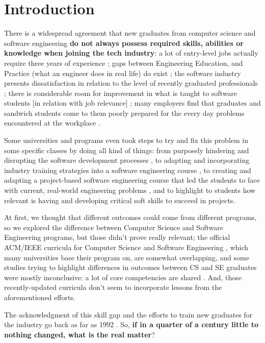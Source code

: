 \documentclass{sigchi}
\begin{document}
\section{Introduction}
There is a widespread agreement that new graduates from computer science and software engineering \textbf{do not always possess required skills, abilities or knowledge when joining the tech industry}: a lot of entry-level jobs actually require three years of experience \cite{Chakrabarti2018}; gaps between Engineering Education, and Practice (what an engineer does in real life) do exist \cite{Sivanesan2017}; the software industry presents dissatisfaction in relation to the level of recently graduated professionals \cite{Portela2017}; there is considerable room for improvement in what is taught to software students [in relation with job relevance] \cite{Lethbridgea}; many employers find that graduates and sandwich students come to them poorly prepared for the every day problems encountered at the workplace \cite{Dawson2000}.

Some universities and programs even took steps to try and fix this problem in some specific classes by doing all kind of things: from purposely hindering and disrupting the software development processes \cite{Dawson2000}, to adapting and incorporating industry training strategies into a software engineering course \cite{Portela2017}, to creating and adapting a project-based software engineering course that led the students to face with current, real-world engineering problems \cite{Delgado2017}, and to highlight to students how relevant is having and developing critical soft skills to succeed in projects\cite{Bastarrica2017}.

At first, we thought that different outcomes could come from different programs, so we explored the difference between Computer Science and Software Engineering programs, but those didn't prove really relevant; the official ACM/IEEE curricula for Computer Science \cite{Force2013} and Software Engineering \cite{Ardis2015}, which many universities base their program on, are somewhat overlapping, and some studies trying to highlight differences in outcomes between CS and SE graduates were mostly inconclusive: a lot of core competencies are shared \cite{Meziane2004} \cite{Rasool2014}. And, those recently-updated curricula don't seem to incorporate lessons from the aforementioned efforts.

The acknowledgment of this skill gap and the efforts to train new graduates for the industry go back as far as 1992 \cite{Dawson1992}. So, \textbf{if in a quarter of a century little to nothing changed, what is the real matter}?
\end{document}
